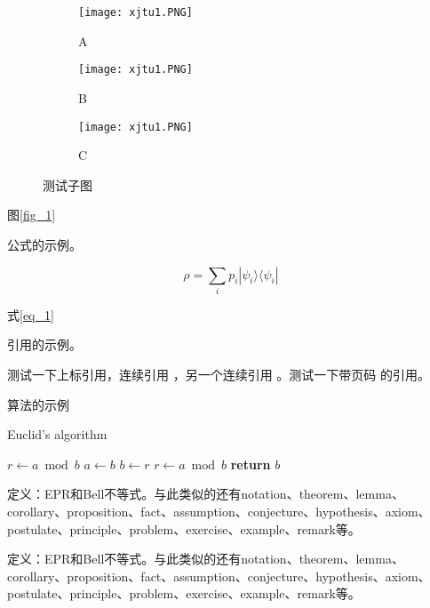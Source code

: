 \documentclass[Mac]{xjtuBSThesis}  %
\begin{document}
\begin{figure}[ht!]
    \centering
    \begin{subfigure}{.3\textwidth}
        \centering
        \texttt{[image: xjtu1.PNG]}
        \caption{A}
    \end{subfigure}
    \begin{subfigure}{.3\textwidth}
        \centering
        \texttt{[image: xjtu1.PNG]}
        \caption{B}
    \end{subfigure}
    \begin{subfigure}{.3\textwidth}
        \centering
        \texttt{[image: xjtu1.PNG]}
        \caption{C}
    \end{subfigure}
    \caption{测试子图}\label{fig_1}
\end{figure}

图\eqref{fig_1}

公式的示例。

\begin{equation}\label{eq_1}
\rho = \sum_i p_i  |\psi_i \rangle \langle \psi_i |
\end{equation}

式\eqref{eq_1}

引用的示例。

测试一下上标引用，连续引用
\cite{newman2001random,aiello2000random,bollobas2001random}，另一个连续引用
\cite{newman2001random,bollobas2001random,barabasi1999emergence}。测试一下带页码
的引用\cite[124--128]{erdHos1961strength}。

算法的示例

\begin{algorithm}
    \caption{Euclid’s algorithm}
    \label{alg:euclid}
    \begin{algorithmic}[1]
        \State $r\gets a\bmod b$
        \State $a\gets b$
        \State $b\gets r$
        \State $r\gets a\bmod b$
        \EndWhile\label{euclidendwhile}
       \State \textbf{return} $b$
       \EndProcedure
   \end{algorithmic}
\end{algorithm}


\begin{definition}
定义：EPR和Bell不等式。与此类似的还有notation、theorem、lemma、corollary、proposition、fact、assumption、conjecture、hypothesis、axiom、postulate、principle、problem、exercise、example、remark等。
\end{definition}
\begin{theorem}
定义：EPR和Bell不等式。与此类似的还有notation、theorem、lemma、corollary、proposition、fact、assumption、conjecture、hypothesis、axiom、postulate、principle、problem、exercise、example、remark等。
\end{theorem}
\end{document}
